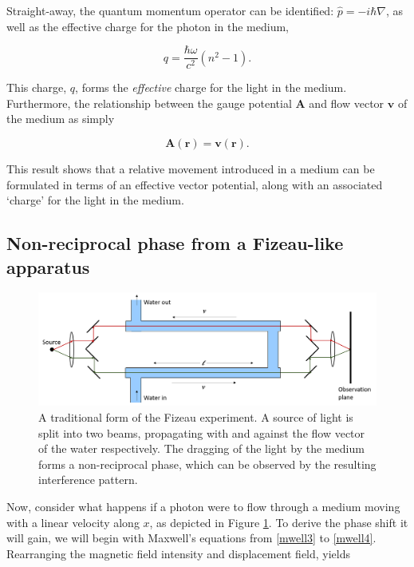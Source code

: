 Straight-away, the quantum momentum operator can be identified: $\hat{p} = -i \hbar \nabla$, as well as the effective charge for the photon in the medium,

\begin{equation}
q =\dfrac{\hbar \omega}{c^2}  (n^2 - 1).
\label{effectiveCharge}
\end{equation}

This charge, $q$, forms the \textit{effective} charge for the light in the medium. Furthermore, the relationship between the gauge potential $\bm{A}$ and flow vector $\bm{v}$ of the medium as simply

\begin{equation}
\bm{A(r)} = \bm{v(r)}.
\end{equation}

This result shows that a relative movement introduced in a medium can be formulated in terms of an effective vector potential, along with an associated `charge' for the light in the medium. 

\subsection{Non-reciprocal phase from a Fizeau-like apparatus}

\begin{figure}[t]
	\centering
	\includegraphics[width=\textwidth]{figures/fizeau.png}
	\caption[The standard apparatus for the Fizeau experiment]{A traditional form of the Fizeau experiment. A source of light is split into two beams, propagating with and against the flow vector of the water respectively. The dragging of the light by the medium forms a non-reciprocal phase, which can be observed by the resulting interference pattern.}
	\label{fig:fizeau}
\end{figure}


Now, consider what happens if a photon were to flow through a medium moving with a linear velocity along $x$, as depicted in Figure \ref{fig:fizeau}. To derive the phase shift it will gain, we will begin with Maxwell's equations from \ref{mwell3} to \ref{mwell4}. Rearranging the magnetic field intensity and displacement field, yields

